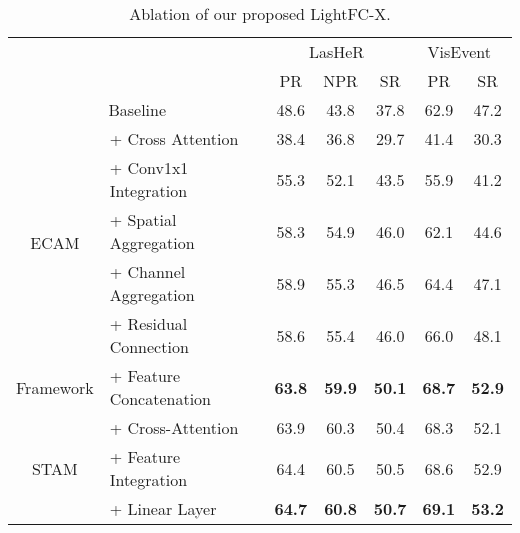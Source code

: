 \begin{table}[t]
\centering
\footnotesize
\renewcommand{\arraystretch}{1.05}
\setlength{\tabcolsep}{2.5pt}

\begin{tabular}{clll|ccc|cc}
\hline
\multicolumn{4}{c|}{\multirow{2}{*}{}}                                                    & \multicolumn{3}{c|}{LasHeR~\cite{lasher}} & \multicolumn{2}{c}{VisEvent~\cite{visevent}} \\ \cline{5-9} 
\multicolumn{4}{c|}{}                                                                     & PR      & NPR     & SR      & PR            & SR           \\ \hline
\multicolumn{4}{c|}{Baseline}                                                             & 48.6    & 43.8    & 37.8    & 62.9          & 47.2         \\ \hline
\multicolumn{2}{c|}{\multirow{5}{*}{ECAM}} & \multicolumn{2}{l|}{+ Cross Attention}       & 38.4    & 36.8    & 29.7    & 41.4          & 30.3         \\
\multicolumn{2}{l|}{}                      & \multicolumn{2}{l|}{+ Conv1x1 Integration}   & 55.3    & 52.1    & 43.5    & 55.9          & 41.2         \\
\multicolumn{2}{l|}{}                      & \multicolumn{2}{l|}{+ Spatial Aggregation}   & 58.3    & 54.9    & 46.0    & 62.1          & 44.6         \\
\multicolumn{2}{l|}{}                      & \multicolumn{2}{l|}{+ Channel Aggregation}   & 58.9    & 55.3    & 46.5    & 64.4          & 47.1         \\
\multicolumn{2}{l|}{}                      & \multicolumn{2}{l|}{+ Residual Connection}   & 58.6    & 55.4    & 46.0    & 66.0          & 48.1         \\ \hline
\multicolumn{2}{c|}{Framework}             & \multicolumn{2}{l|}{+ Feature Concatenation} & \textbf{63.8} & \textbf{59.9} & \textbf{50.1} & \textbf{68.7} & \textbf{52.9}         \\ \hline
\multicolumn{2}{c|}{\multirow{3}{*}{STAM}} & \multicolumn{2}{l|}{+ Cross-Attention}       & 63.9    & 60.3    & 50.4    & 68.3          & 52.1         \\
\multicolumn{2}{l|}{}                      & \multicolumn{2}{l|}{+ Feature Integration}   & 64.4    & 60.5    & 50.5    & 68.6          & 52.9         \\
\multicolumn{2}{l|}{}                      & \multicolumn{2}{l|}{+ Linear Layer}          & \textbf{64.7} & \textbf{60.8} & \textbf{50.7} & \textbf{69.1} & \textbf{53.2}         \\ \hline
\end{tabular}
\caption{Ablation of our proposed LightFC-X.}
\label{table ablation ecm}
\end{table}
